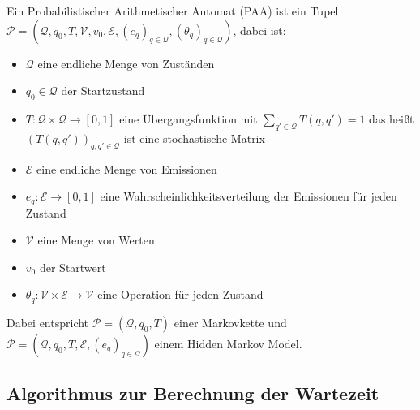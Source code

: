 \begin{definition}[PAA]
 Ein Probabilistischer Arithmetischer Automat (PAA) ist ein Tupel
 $ \mathcal{P} = (\mathcal{Q}, q_0, T, \mathcal{V}, v_0, \mathcal{E}, (e_q)_{q\in\mathcal{Q}}, (\theta_q)_{q\in\mathcal{Q}})$, dabei ist:
 \begin{itemize}
  \item $\mathcal{Q}$ eine endliche Menge von Zuständen
  \item $q_0 \in \mathcal{Q}$ der Startzustand
  \item $T: \mathcal{Q} \times \mathcal{Q} \rightarrow [0,1]$ eine Übergangsfunktion mit $\sum_{q' \in \mathcal{Q}} T(q, q') = 1 $ das heißt $(T(q,q'))_{q,q' \in \mathcal{Q}}$ ist eine stochastische Matrix
  \item $\mathcal{E}$ eine endliche Menge von Emissionen
  \item $e_q: \mathcal{E} \rightarrow [0,1]$ eine Wahrscheinlichkeitsverteilung der Emissionen für jeden Zustand
  \item $\mathcal{V}$ eine Menge von Werten
  \item $v_0$ der Startwert
  \item $\theta_q: \mathcal{V} \times \mathcal{E} \rightarrow \mathcal{V}$ eine Operation für jeden Zustand
 \end{itemize}
\end{definition}
Dabei entspricht $ \mathcal{P} = (\mathcal{Q}, q_0, T)$ einer Markovkette und $ \mathcal{P} = (\mathcal{Q}, q_0, T, \mathcal{E}, (e_q)_{q\in\mathcal{Q}})$ einem Hidden Markov Model. 

\subsection{Algorithmus zur Berechnung der Wartezeit}

